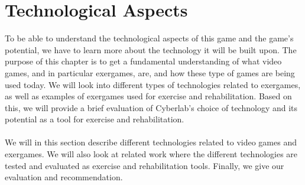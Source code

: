\chapter{Technological Aspects}
To be able to understand the technological aspects of this game and the game's potential, we have to learn more about the technology it will be built upon.  The purpose of this chapter is to get a fundamental understanding of what video games, and in particular exergames, are, and how these type of games are being used today. We will look into different types of technologies related to exergames, as well as examples of exergames used for exercise and rehabilitation. Based on this, we will provide a brief evaluation of Cyberlab's choice of technology and its potential as a tool for exercise and rehabilitation.  \\ \\ 
We will in this section describe different technologies related to video games and exergames. We will also look at related work where the different technologies are tested and evaluated as exercise and rehabilitation tools. Finally, we give our evaluation and recommendation.\\ \\

